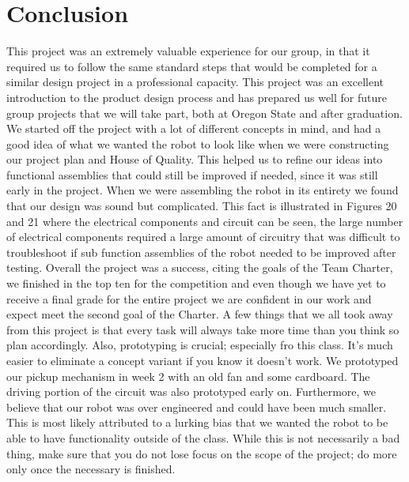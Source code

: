 \documentclass[12pt,letterpaper,titlepage]{article}
\begin{document}
\section{Conclusion}
\indent This project was an extremely valuable experience for our group, in that it required us to follow the same standard steps that would be completed for a similar design project in a professional capacity. This project was an excellent introduction to the product design process and has prepared us well for future group projects that we will take part, both at Oregon State and after graduation. We started off the project with a lot of different concepts in mind, and had a good idea of what we wanted the robot to look like when we were constructing our project plan and House of Quality. This helped us to refine our ideas into functional assemblies that could still be improved if needed, since it was still early in the project. When we were assembling the robot in its entirety we found that our design was sound but complicated. This fact is illustrated in Figures 20 and 21 where the electrical components and circuit can be seen, the large number of electrical components required a large amount of circuitry that was difficult to troubleshoot if sub function assemblies of the robot needed to be improved after testing. Overall the project was a success, citing the goals of the Team Charter, we finished in the top ten for the competition and even though we have yet to receive a final grade for the entire project we are confident in our work and expect meet the second goal of the Charter. A few things that we all took away from this project is that every task will always take more time than you think so plan accordingly. Also, prototyping is crucial; especially fro this class. It's much easier to eliminate a concept variant if you know it doesn't work. We prototyped our pickup mechanism in week 2 with an old fan and some cardboard. The driving portion of the circuit was also prototyped early on. Furthermore, we believe that our robot was over engineered and could have been much smaller. This is most likely attributed to a lurking bias that we wanted the robot to be able to have functionality outside of the class. While this is not necessarily a bad thing, make sure that you do not lose focus on the scope of the project; do more only once the necessary is finished. 
\end{document}
